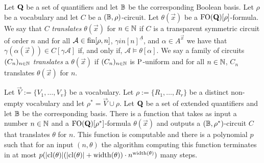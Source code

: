 \documentclass[../main/thesis.tex]{subfiles}
\begin{document}
Let $\mathbf{Q}$ be a set of quantifiers and let $\mathbb{B}$ be the corresponding
Boolean basis. Let $\rho$ be a vocabulary and let $C$ be a $(\mathbb{B},
\rho)$-circuit. Let $\theta(\vec{x})$ be a $\text{\upshape FO}(\mathbf{Q})[\rho]$-formula. We
say that $C$ \emph{translates} $\theta(\vec{x})$ for $n \in \mathbb{N}$ if $C$ is a
transparent symmetric circuit of order $n$ and for all $\mathcal{A} \in
\text{\upshape fin}[\rho, n]$, $\gamma in [n]^{\underline{A}}$, and $\alpha \in A^{\vec{x}}$ we
have that $\gamma (\alpha (\vec{x})) \in C[\gamma \mathcal{A}]$ if, and only if,
$\mathcal{A} \models \theta[\alpha]$. We say a family of circuits $(C_n)_{n \in
  \mathbb{N}}$ \emph{translates} a $\theta(\vec{x})$ if $(C_n)_{n \in \mathbb{N}}$ is
$\mathrm{P}$-uniform and for all $n \in \mathbb{N}$, $C_n$ translates $\theta(\vec{x})$ for
$n$.

\begin{lem}
  Let $\vec{V} := \{V_1, \ldots, V_v\}$ be a vocabulary. Let $\rho := \{R_1,
  \ldots, R_r\}$ be a distinct non-empty vocabulary and let $\rho^* = \vec{V}
  \cup \rho$. Let $\mathbf{Q}$ be a set of extended quantifiers and let $\mathbb{B}$ be
  the corresponding basis. There is a function that takes as input a number $n
  \in \mathbb{N}$ and a $\text{\upshape FO}(\mathbf{Q})[\rho^*]$-formula $\theta(\vec{x})$ and
  outputs a $(\mathbb{B}, \rho^*)$-circuit $C$ that translates $\theta$ for $n$. This
  function is computable and there is a polynomial $p$ such that for an input
  $(n, \theta)$ the algorithm computing this function terminates in at most
  $p(\vert \mathrm{cl}(\theta) \vert (\vert \mathrm{cl}(\theta) \vert + \mathrm{width}(\theta)) \cdot
  n^{\mathrm{width}(\theta)})$ many steps.
  \label{lem:translating-FOquant-to-formulas}
\end{lem}
\end{document}
